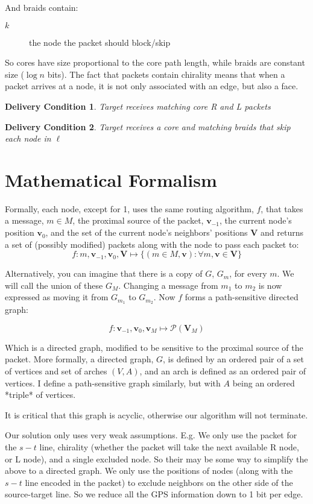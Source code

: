 \documentclass{llncs}
\newtheorem{deliverycondition}{Delivery Condition}
\begin{document}
\noindent
And braids contain:
\begin{description}
  \item[ \(k\) ] the node the packet should block/skip
\end{description}

So cores have size proportional to the core path length, while braids are constant size (\(\log n\) bits). The fact that packets contain chirality means that when a packet arrives at a node, it is not only associated with an edge, but also a face.


\begin{deliverycondition}\label{dc:cores}
Target receives matching core R and L packets
\end{deliverycondition}
\begin{deliverycondition}\label{dc:braids}
Target receives a core and matching braids that skip each node in \(\ell\)
\end{deliverycondition}

\newpage

\section{Mathematical Formalism}

Formally, each node, except for 1, uses the same routing algorithm, \( f \), that takes a message, \(m \in M\), the proximal source of the packet, \(\mathbf v_{-1}\), the current node's position \(\mathbf v_0\), and the set of the current node's neighbors' positions \(\mathbf V\) and returns a set of (possibly modified) packets along with the node to pass each packet to:
\[ f: m, \mathbf v_{-1}, \mathbf v_0, \mathbf V \mapsto \{ (m \in M, \mathbf v) : \forall m, \mathbf v \in \mathbf V \} \]

Alternatively, you can imagine that there is a copy of \( G \), \( G_m \), for every \( m \). We will call the union of these \(G_M\). Changing a message from \(m_1\) to \(m_2\) is now expressed as moving it from \(G_{m_1}\) to \(G_{m_2}\). Now \(f\) forms a path-sensitive directed graph:

\[ f: \mathbf v_{-1}, \mathbf v_0, \mathbf v_M \mapsto \mathcal P( \mathbf V_M ) \]

Which is a directed graph, modified to be sensitive to the proximal source of the packet.  More formally, a directed graph, \(G\), is defined by an ordered pair of a set of vertices and set of arches \((V, A)\), and an arch is defined as an ordered pair of vertices.  I define a path-sensitive graph similarly, but with \(A\) being an ordered *triple* of vertices.

It is critical that this graph is acyclic, otherwise our algorithm will not terminate.

Our solution only uses very weak assumptions.  E.g. We only use the packet for the \(s-t\) line, chirality (whether the packet will take the next available R node, or L node), and a single excluded node. So their may be some way to simplify the above to a directed graph.  We only use the positions of nodes (along with the \(s-t\) line encoded in the packet) to exclude neighbors on the other side of the source-target line. So we reduce all the GPS information down to 1 bit per edge.
\end{document}
